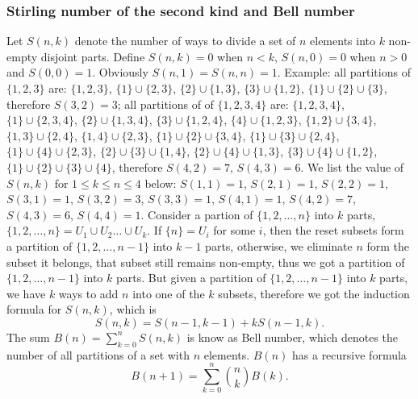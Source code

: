 \subsubsection{Stirling number of the second kind and Bell number}
Let $S(n,k)$ denote the number of ways to divide 
a set of $n$ elements into $k$ non-empty disjoint
parts. Define $S(n,k)=0$ when $n < k$, $S(n,0)=0$ when $n>0$ 
and $S(0,0)=1$. Obviously $S(n,1)=S(n,n)=1$. \newline
Example:	\newline
all partitions of $\{1,2,3\}$ are:	\newline
$\{1,2,3\}$, \newline
$\{1\} \cup \{2,3\}$, $\{2\} \cup \{1,3\}$, $\{3\} \cup \{1,2\}$,	\newline
$\{1\} \cup \{2\} \cup \{3\}$,	\newline
therefore $S(3,2)=3$;
\newline
all partitions of of $\{1,2,3,4\}$ are: \newline
$\{1,2,3,4\}$,	\newline
$\{1\} \cup \{2,3,4\}$, $\{2\} \cup \{1,3,4\}$, $\{3\} \cup \{1,2,4\}$, $\{4\} \cup \{1,2,3\}$,	\newline
$\{1,2\} \cup \{3,4\}$, $\{1,3\} \cup \{2,4\}$, $\{1,4\} \cup \{2,3\}$,	\newline
$\{1\} \cup \{2\} \cup \{3,4\}$, $\{1\} \cup \{3\} \cup \{2,4\}$,	\newline
$\{1\} \cup \{4\} \cup \{2,3\}$, $\{2\} \cup \{3\} \cup \{1,4\}$,	\newline
$\{2\} \cup \{4\} \cup \{1,3\}$, $\{3\} \cup \{4\} \cup \{1,2\}$,	\newline
$\{1\} \cup \{2\} \cup \{3\} \cup \{4\}$,	\newline
therefore $S(4,2)=7$, $S(4,3)=6$.
We list the value of $S(n,k)$ for $1 \leq k \leq n \leq 4$ below:	\newline
$S(1,1)=1$,	\newline
$S(2,1)=1$, $S(2,2)=1$,	\newline
$S(3,1)=1$, $S(3,2)=3$,	$S(3,3)=1$,	\newline
$S(4,1)=1$, $S(4,2)=7$,	$S(4,3)=6$, $S(4,4)=1$.	\newline
Consider a partion of $\{1,2, \dots , n\}$ into $k$ parts,
$\{1,2, \dots , n\} = U_1 \cup U_2 \dots \cup U_k$.
If $\{n\}=U_i$ for some $i$, then the reset subsets
form a partition of $\{1,2, \dots , n-1 \}$ into $k-1$ parts,
otherwise, we eliminate $n$ form the subset it
belongs, that subset still remains non-empty, thus we got
a partition of $\{1,2, \dots , n-1\}$ into $k$ parts.
But given a partition of $\{1,2, \dots , n-1\}$ into $k$ parts,
we have $k$ ways to add $n$ into one of the $k$ subsets,
therefore we got the induction formula for $S(n,k)$, which is
$$S(n,k)=S(n-1,k-1) + k S(n-1,k).$$
The sum $B(n)=\sum_{k=0}^n S(n,k)$ is know as Bell number,
which denotes the number of all partitions of a set with
$n$ elements. $B(n)$ has a recursive formula
$$B(n+1)=\sum_{k=0}^n {n \choose k} B(k).$$

